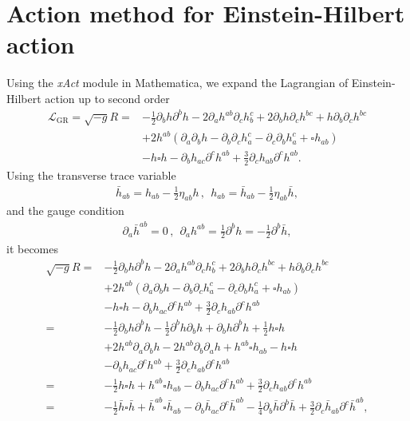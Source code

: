 \documentclass[
    jor,
    amsmath,amssymb,preprint,
    superscriptaddress,
]{revtex4-2}
\begin{document}
\section{Action method for Einstein-Hilbert action}

Using the \textit{xAct} module in Mathematica, we expand the Lagrangian of Einstein-Hilbert action up to second order
\begin{equation}
\begin{aligned}
\mathcal{L}_{\mathrm{GR}} = \sqrt{-g}R = & -\frac{1}{2}\partial_b h \partial^b h - 2\partial_a h^{ab}\partial_c h^c_b + 2\partial_b h\partial_c h^{bc} + h\partial_b\partial_c h^{bc} \\
& + 2h^{ab}(\partial_a\partial_b h-\partial_b\partial_c h^c_a - \partial_c\partial_b h^c_a + \square h_{ab})\\
& - h \square h - \partial_b h_{ac}\partial^c h^{ab} + \frac{3}{2}\partial_c h_{ab}\partial^c h^{ab}.
\end{aligned}
\end{equation}
Using the transverse trace variable 
\begin{align}
\bar{h}_{ab} = h_{ab} - \frac{1}{2}\eta_{ab}h\,,~~h_{ab} = \bar{h}_{ab} - \frac{1}{2}\eta_{ab}\bar{h},
\end{align}
and the gauge condition
\begin{align}
\partial_a \bar{h}^{ab} = 0\,,~~\partial_ah^{ab} = \frac{1}{2} \partial^b h=-\frac{1}{2}\partial^b\bar{h},
\end{align}
it becomes 
\begin{equation}
\begin{aligned}
\sqrt{-g}R = & -\frac{1}{2}\partial_b h \partial^b h - 2\partial_a h^{ab}\partial_c h^c_b + 2\partial_b h\partial_c h^{bc} + h\partial_b\partial_c h^{bc} \\
& + 2h^{ab}(\partial_a\partial_b h-\partial_b\partial_c h^c_a - \partial_c\partial_b h^c_a + \square h_{ab})\\
& - h \square h - \partial_b h_{ac}\partial^c h^{ab} + \frac{3}{2}\partial_c h_{ab}\partial^c h^{ab} \\
= & -\frac{1}{2}\partial_bh\partial^b h - \frac{1}{2}\partial^bh\partial_bh + \partial_bh\partial^bh + \frac{1}{2} h\square h \\
& + 2h^{ab}\partial_a\partial_b h - 2h^{ab}\partial_b\partial_a h + h^{ab}\square h_{ab} - h\square h\\
& - \partial_b h_{ac}\partial^c h^{ab} + \frac{3}{2}\partial_c h_{ab}\partial^c h^{ab}\\
= & -\frac{1}{2} h\square h + h^{ab}\square h_{ab} - \partial_b h_{ac}\partial^c h^{ab} + \frac{3}{2}\partial_c h_{ab}\partial^c h^{ab} \\
= & -\frac{1}{2} \bar{h}\square \bar{h} + \bar{h}^{ab}\square \bar{h}_{ab} - \partial_b \bar{h}_{ac}\partial^c \bar{h}^{ab} - \frac{1}{4}\partial_b\bar{h} \partial^b\bar{h} + \frac{3}{2}\partial_c \bar{h}_{ab}\partial^c \bar{h}^{ab},
\end{aligned}
\end{equation}
\end{document}

